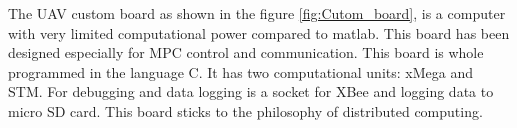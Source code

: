 \documentclass{article}
\begin{document}
The UAV custom board \cite{tom} as shown in the figure \ref{fig:Cutom_board}, is a computer with very limited computational power compared to matlab. This board has been designed \cite{tom} especially for MPC control and communication. This board is whole programmed in the language C. It has two computational units: xMega and STM. For debugging and data logging is a socket for XBee and logging data to micro SD card. This board sticks to the philosophy of distributed computing.

\begin{figure}[h]
\label{fig:Cutom_board}
\centering

\begin{subfigure}[b]{0.515\textwidth}
\end{subfigure}
\end{figure}
\end{document}
